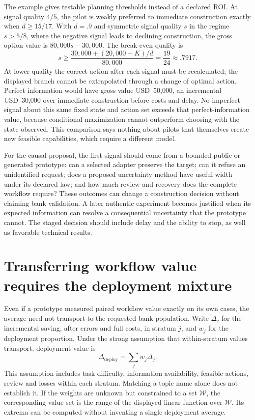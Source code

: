 The example gives testable planning thresholds instead of a declared ROI.
At signal quality $4/5$, the pilot is weakly preferred to immediate construction exactly when
$d\geq15/17$. With $d=.9$ and symmetric signal quality $s$ in the regime
$s>5/8$, where the negative signal leads to declining construction, the gross
option value is $80{,}000s-30{,}000$. The break-even quality is
\[
 s\geq \frac{30{,}000+(20{,}000+K)/d}{80{,}000}
       =\frac{19}{24}\approx.7917.
\]
At lower quality the correct action after each signal must be recalculated;
the displayed branch cannot be extrapolated through a change of optimal action.
Perfect information would have gross value USD~50,000, an incremental
USD~30,000 over immediate construction before costs and delay. No imperfect
signal about this same fixed state and action set exceeds that perfect-information
value, because conditional maximization cannot outperform choosing with the
state observed. This comparison says nothing about pilots that themselves
create new feasible capabilities, which require a different model.
\citep{exec14_l8_economics}

For the causal proposal, the first signal should come from a bounded public or
generated prototype: can a selected adapter preserve the target; can it refuse
an unidentified request; does a proposed uncertainty method have useful width
under its declared law; and how much review and recovery does the complete
workflow require? These outcomes can change a construction decision without
claiming bank validation. A later authentic experiment becomes justified when
its expected information can resolve a consequential uncertainty that the
prototype cannot. The staged decision should include delay and the ability to
stop, as well as favorable technical results. \citep{exec14_l8_design}

\section{Transferring workflow value requires the deployment mixture}
\label{exec14:l8-transfer}

Even if a prototype measured paired workflow value exactly on its own cases,
the average need not transport to the requested bank population. Write
$\Delta_j$ for the incremental saving, after errors and full costs, in stratum
$j$, and $w_j$ for the deployment proportion. Under the strong assumption that
within-stratum values transport, deployment value is
\[
 \Delta_{\mathrm{deploy}}=\sum_j w_j\Delta_j.
\]
This assumption includes task difficulty, information availability, feasible
actions, review and losses within each stratum. Matching a topic name alone
does not establish it. If the weights are unknown but constrained to a set
$\mathcal W$, the corresponding value set is the range of the displayed linear
function over $\mathcal W$. Its extrema can be computed without inventing a
single deployment average. \citep{exec14_l8_economics}

